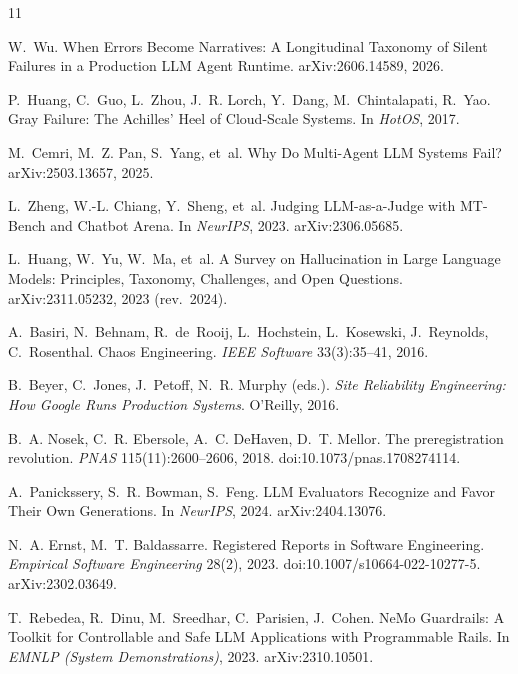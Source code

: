 \documentclass[11pt]{article}
\begin{document}
\begin{thebibliography}{11}

W.~Wu.
\newblock When Errors Become Narratives: A Longitudinal Taxonomy of
Silent Failures in a Production LLM Agent Runtime.
\newblock arXiv:2606.14589, 2026.

P.~Huang, C.~Guo, L.~Zhou, J.~R. Lorch, Y.~Dang, M.~Chintalapati,
R.~Yao.
\newblock Gray Failure: The Achilles' Heel of Cloud-Scale Systems.
\newblock In \emph{HotOS}, 2017.

M.~Cemri, M.~Z. Pan, S.~Yang, et~al.
\newblock Why Do Multi-Agent LLM Systems Fail?
\newblock arXiv:2503.13657, 2025.

L.~Zheng, W.-L. Chiang, Y.~Sheng, et~al.
\newblock Judging LLM-as-a-Judge with MT-Bench and Chatbot Arena.
\newblock In \emph{NeurIPS}, 2023. arXiv:2306.05685.

L.~Huang, W.~Yu, W.~Ma, et~al.
\newblock A Survey on Hallucination in Large Language Models:
Principles, Taxonomy, Challenges, and Open Questions.
\newblock arXiv:2311.05232, 2023 (rev.\ 2024).

A.~Basiri, N.~Behnam, R.~de~Rooij, L.~Hochstein, L.~Kosewski,
J.~Reynolds, C.~Rosenthal.
\newblock Chaos Engineering.
\newblock \emph{IEEE Software} 33(3):35--41, 2016.

B.~Beyer, C.~Jones, J.~Petoff, N.~R. Murphy (eds.).
\newblock \emph{Site Reliability Engineering: How Google Runs
Production Systems}.
\newblock O'Reilly, 2016.

B.~A. Nosek, C.~R. Ebersole, A.~C. DeHaven, D.~T. Mellor.
\newblock The preregistration revolution.
\newblock \emph{PNAS} 115(11):2600--2606, 2018.
doi:10.1073/pnas.1708274114.

A.~Panickssery, S.~R. Bowman, S.~Feng.
\newblock LLM Evaluators Recognize and Favor Their Own Generations.
\newblock In \emph{NeurIPS}, 2024. arXiv:2404.13076.

N.~A. Ernst, M.~T. Baldassarre.
\newblock Registered Reports in Software Engineering.
\newblock \emph{Empirical Software Engineering} 28(2), 2023.
doi:10.1007/s10664-022-10277-5. arXiv:2302.03649.

T.~Rebedea, R.~Dinu, M.~Sreedhar, C.~Parisien, J.~Cohen.
\newblock NeMo Guardrails: A Toolkit for Controllable and Safe LLM
Applications with Programmable Rails.
\newblock In \emph{EMNLP (System Demonstrations)}, 2023.
arXiv:2310.10501.

\end{thebibliography}
\end{document}
